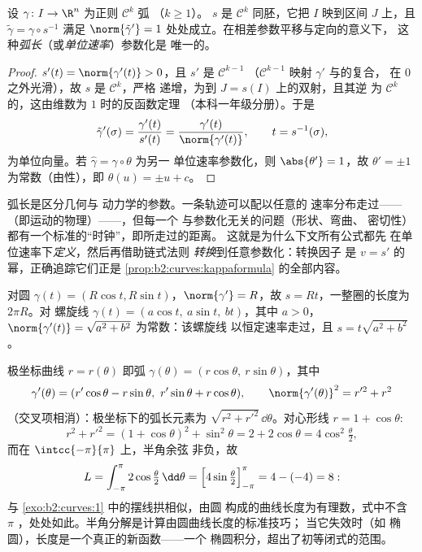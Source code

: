 \begin{theorem}[弧长参数化]\label{thm:b2:curves:arclength}
设 $\gamma \colon I \to \R^n$ 为正则 $\mathcal{C}^k$ 弧
（$k \geq 1$）。 $s$ 是 $\mathcal{C}^k$
同胚，它把 $I$ 映到区间 $J$ 上，且 $\tilde\gamma =
\gamma \circ s^{-1}$ 满足 $\norm{\tilde\gamma'} = 1$
处处成立。在相差参数平移与定向的意义下，
这种\emph{弧长}（或\emph{单位速率}）参数化是
唯一的。
\end{theorem}

\begin{proof}
$s'(t) = \norm{\gamma'(t)} > 0$，且 $s'$ 是 $\mathcal{C}^{k-1}$
（$\mathcal{C}^{k-1}$ 映射 $\gamma'$ 与的复合，
在 $0$ 之外光滑），故 $s$ 是 $\mathcal{C}^k$，严格
递增，为到 $J = s(I)$ 上的双射，且其逆
为 $\mathcal{C}^k$ 的，这由维数为 $1$ 时的反函数定理
（本科一年级分册）。于是
\[
\tilde\gamma'(\sigma)
= \frac{\gamma'(t)}{s'(t)}
= \frac{\gamma'(t)}{\norm{\gamma'(t)}},
\qquad t = s^{-1}(\sigma),
\]
为单位向量。若 $\hat\gamma = \gamma\circ\theta$ 为另一
单位速率参数化，则 $\abs{\theta'} = 1$，故 $\theta'
= \pm 1$ 为常数（由性），即 $\theta(u) = \pm u + c$。
\end{proof}

\begin{remark}
弧长是区分几何与
动力学的参数。一条轨迹可以配以任意的
速率分布走过——（即运动的物理）——，但每一个
与参数化无关的问题（形状、弯曲、
密切性）都有一个标准的“时钟”，即所走过的距离。
这就是为什么下文所有公式都先
在单位速率下\emph{定义}，然后再借助链式法则
\emph{转换}到任意参数化：转换因子
是 $v = s'$ 的幂，正确追踪它们正是
\cref{prop:b2:curves:kappaformula} 的全部内容。
\end{remark}

\begin{example}[圆与螺旋线]\label{ex:b2:curves:helix}
对圆 $\gamma(t) = (R\cos t, R\sin t)$，$\norm{\gamma'} =
R$，故 $s = Rt$，一整圈的长度为 $2\pi R$。对
螺旋线 $\gamma(t) = (a\cos t,\ a\sin t,\ bt)$，其中 $a > 0$，
$\norm{\gamma'(t)} = \sqrt{a^2 + b^2}$ 为常数：该螺旋线
以恒定速率走过，且 $s = t\sqrt{a^2 + b^2}$。
\end{example}

\begin{example}[极坐标中的
弧长]\label{ex:b2:curves:polarlength}
极坐标曲线 $r = r(\theta)$ 即弧 $\gamma(\theta) =
(r\cos\theta,\ r\sin\theta)$，其中
\[
\gamma'(\theta) = (r'\cos\theta - r\sin\theta,\
r'\sin\theta + r\cos\theta),
\qquad
\norm{\gamma'(\theta)}^2 = r'^2 + r^2
\]
（交叉项相消）：极坐标下的弧长元素为
$\sqrt{r^2 + r'^2}\,\dd\theta$。对心形线 $r = 1 +
\cos\theta$:
\[
r^2 + r'^2 = (1 + \cos\theta)^2 + \sin^2\theta = 2 +
2\cos\theta = 4\cos^2\tfrac\theta2,
\]
而在 $\intcc{-\pi}{\pi}$ 上，半角余弦
非负，故
\[
L = \int_{-\pi}^{\pi}2\cos\tfrac\theta2\,\dd\theta
= \Bigl[4\sin\tfrac\theta2\Bigr]_{-\pi}^{\pi}
= 4 - (-4) = 8 :
\]
与 \cref{exo:b2:curves:1} 中的摆线拱相似，由圆
构成的曲线长度为有理数，式中不含 $\pi$
，处处如此。半角分解是计算由圆曲线长度的标准技巧；
当它失效时（如
椭圆），长度是一个真正的新函数——一个
椭圆积分，超出了初等闭式的范围。
\end{example}

